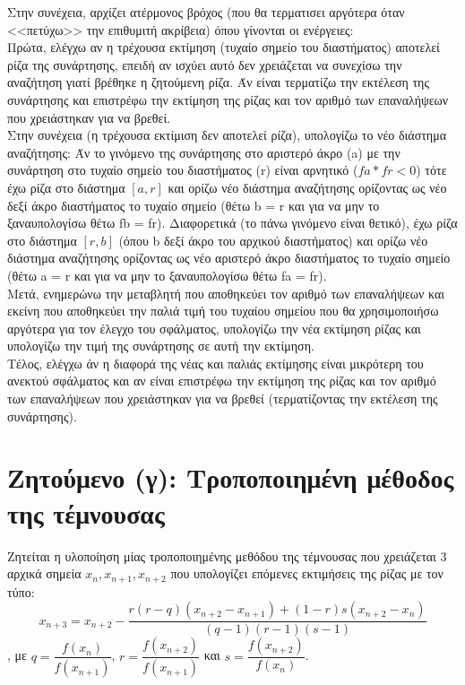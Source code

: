 \documentclass[a4paper,11pt]{article}
\newcommand{\lt}{\latintext}
\newcommand{\gt}{\greektext}
\begin{document}
Στην συνέχεια, αρχίζει ατέρμονος βρόχος (που θα τερματισει αργότερα όταν <<πετύχω>> την επιθυμιτή ακρίβεια) όπου γίνονται οι ενέργειες:\\
Πρώτα, ελέγχω αν η τρέχουσα εκτίμηση (τυχαίο σημείο του διαστήματος) αποτελεί ρίζα της συνάρτησης, επειδή αν ισχύει αυτό δεν χρειάζεται να συνεχίσω την αναζήτηση γιατί βρέθηκε η ζητούμενη ρίζα. Άν είναι τερματίζω την εκτέλεση της συνάρτησης και επιστρέφω την εκτίμηση της ρίζας και τον αριθμό των επαναλήψεων που χρειάστηκαν για να βρεθεί.\\
Στην συνέχεια (η τρέχουσα εκτίμιση δεν αποτελεί ρίζα), υπολογίζω το νέο διάστημα αναζήτησης: Άν το γινόμενο της συνάρτησης στο αριστερό άκρο ({\lt a}) με την συνάρτηση στο τυχαίο σημείο του διαστήματος ({\lt r}) είναι αρνητικό ({\lt $fa * fr < 0$}) τότε έχω ρίζα στο διάστημα $[a, r]$ και ορίζω νέο διάστημα αναζήτησης ορίζοντας ως νέο δεξί άκρο διαστήματος το τυχαίο σημείο (θέτω {\lt b = r} και για να μην το ξαναυπολογίσω θέτω {\lt fb = fr}). Διαφορετικά (το πάνω γινόμενο είναι θετικό), έχω ρίζα στο διάστημα {\lt $[r, b]$} (όπου {\lt b} δεξί άκρο του αρχικού διαστήματος) και ορίζω νέο διάστημα αναζήτησης ορίζοντας ως νέο αριστερό άκρο διαστήματος το τυχαίο σημείο (θέτω {\lt a = r} και για να μην το ξαναυπολογίσω θέτω {\lt fa = fr}).\\
Μετά, ενημερώνω την μεταβλητή που αποθηκεύει τον αριθμό των επαναλήψεων και εκείνη που αποθηκεύει την παλιά τιμή του τυχαίου σημείου που θα χρησιμοποιήσω αργότερα για τον έλεγχο του σφάλματος, υπολογίζω την νέα εκτίμηση ρίζας και υπολογίζω την τιμή της συνάρτησης σε αυτή την εκτίμηση.\\
Τέλος, ελέγχω άν η διαφορά της νέας και παλιάς εκτίμησης είναι μικρότερη του ανεκτού σφάλματος και αν είναι επιστρέφω την εκτίμηση της ρίζας και τον αριθμό των επαναλήψεων που χρειάστηκαν για να βρεθεί (τερματίζοντας την εκτέλεση της συνάρτησης).

\section{Ζητούμενο (γ): Τροποποιημένη μέθοδος της τέμνουσας}
Ζητείται η υλοποίηση μίας τροποποιημένης μεθόδου της τέμνουσας που χρειάζεται 3 αρχικά σημεία {\lt $x_n, x_{n+1}, x_{n+2}$} που υπολογίζει επόμενες εκτιμήσεις της ρίζας με τον τύπο: \lt 
\[x_{n+3} = x_{n+2} - \dfrac{r(r-q)(x_{n+2}-x_{n+1}) + (1-r)s(x_{n+2}-x_n)}{(q-1)(r-1)(s-1)} \], {\gt με} $q = \dfrac{f(x_n)}{f(x_{n+1})}$, $r = \dfrac{f(x_{n+2})}{f(x_{n+1})}$ {\gt και} $s = \dfrac{f(x_{n+2})}{f(x_n)}$. \gt
\end{document}

